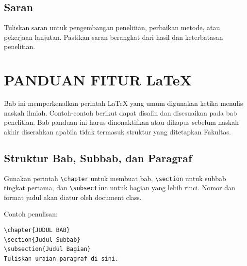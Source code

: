 \documentclass[skripsi]{ugmskripsi}
\newif\ifshowlatexguide
\begin{document}
\section{Saran}
Tuliskan saran untuk pengembangan penelitian, perbaikan metode, atau pekerjaan
lanjutan. Pastikan saran berangkat dari hasil dan keterbatasan penelitian.


\ifshowlatexguide
\chapter{PANDUAN FITUR LaTeX}

Bab ini memperkenalkan perintah LaTeX yang umum digunakan ketika menulis
naskah ilmiah. Contoh-contoh berikut dapat disalin dan disesuaikan pada bab
penelitian. Bab panduan ini harus dinonaktifkan atau dihapus sebelum naskah
akhir diserahkan apabila tidak termasuk struktur yang ditetapkan Fakultas.

\section{Struktur Bab, Subbab, dan Paragraf}
Gunakan perintah \verb|\chapter| untuk membuat bab, \verb|\section| untuk
subbab tingkat pertama, dan \verb|\subsection| untuk bagian yang lebih rinci.
Nomor dan format judul akan diatur oleh document class.

Contoh penulisan:
\begin{verbatim}
\chapter{JUDUL BAB}
\section{Judul Subbab}
\subsection{Judul Bagian}
Tuliskan uraian paragraf di sini.
\end{verbatim}
\end{document}
